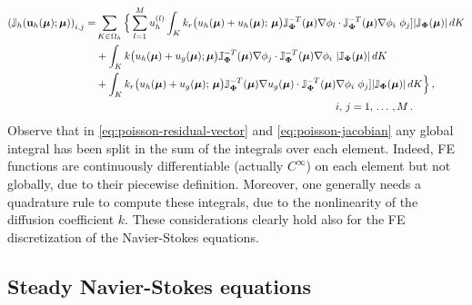 \documentclass[12pt, a4paper, twoside, openright]{report}
\numberwithin{equation}{chapter}
\theoremstyle{theorem}
\theoremstyle{definition}
\theoremstyle{remark}
\theoremstyle{proposition}
\numberwithin{figure}{chapter}
\newcommand{\bg}[1]{\boldsymbol{#1}}
\begin{document}
		\begin{equation*}
			\label{eq:poisson-jacobian}
			\begin{aligned}
			\left( \mathbb{J}_h(\mathbf{u}_h(\bg{\mu}); \bg{\mu}) \right)_{i,j} = & \sum_{K \in \Omega_h} \Big\lbrace \sum_{l = 1}^M u_h^{(l)} \int_K k_r \big(u_h(\bg{\mu}) + u_h(\bg{\mu}); \, \bg{\mu} \big) \mathbb{J}^{-T}_{\bg{\Phi}}(\bg{\mu}) \nabla \phi_l \cdot \mathbb{J}^{-T}_{\bg{\Phi}}(\bg{\mu}) \nabla \phi_i ~ \phi_j ] |\mathbb{J}_{\bg{\Phi}}(\bg{\mu})| \, dK \\
			& + \int_K k \big( u_h(\bg{\mu}) + u_g(\bg{\mu}); \bg{\mu} \big) \mathbb{J}^{-T}_{\bg{\Phi}}(\bg{\mu}) \nabla \phi_j \cdot \mathbb{J}^{-T}_{\bg{\Phi}}(\bg{\mu}) \nabla \phi_i ~ |\mathbb{J}_{\bg{\Phi}}(\bg{\mu})| \, dK \\
			& + \int_K k_r \big(u_h(\bg{\mu}) + u_g(\bg{\mu}); \, \bg{\mu} \big) \mathbb{J}^{-T}_{\bg{\Phi}}(\bg{\mu}) \nabla u_g(\bg{\mu}) \cdot \mathbb{J}^{-T}_{\bg{\Phi}}(\bg{\mu}) \nabla \phi_i ~ \phi_j ] |\mathbb{J}_{\bg{\Phi}}(\bg{\mu})| \, dK \Big\rbrace \, , \\
			& \hspace*{8cm} i, \, j = 1, \, \ldots \, , M \, . 
			\end{aligned}
		\end{equation*}
		Observe that in \eqref{eq:poisson-residual-vector} and \eqref{eq:poisson-jacobian} any global integral has been split in the sum of the integrals over each element. Indeed, FE functions are continuously differentiable (actually $C^{\infty}$) on each element but not globally, due to their piecewise definition. Moreover, one generally needs a quadrature rule to compute these integrals, due to the nonlinearity of the diffusion coefficient $k$. These considerations clearly hold also for the FE discretization of the Navier-Stokes equations.
		
	\subsection{Steady Navier-Stokes equations}
	\label{section:Steady Navier-Stokes equations (FE)}
	
\end{document}
